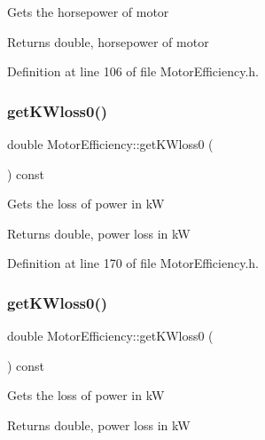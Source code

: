 Gets the horsepower of motor \begin{DoxyReturn}{Returns}
double, horsepower of motor 
\end{DoxyReturn}


Definition at line 106 of file Motor\+Efficiency.\+h.

\mbox{\label{class_motor_efficiency_a47398ac8203f5b79a0ca435673a4bc16}} 
\subsubsection{\texorpdfstring{get\+K\+Wloss0()}{getKWloss0()}\hspace{0.1cm}{\footnotesize\ttfamily [1/3]}}
{\footnotesize\ttfamily double Motor\+Efficiency\+::get\+K\+Wloss0 (\begin{DoxyParamCaption}{ }\end{DoxyParamCaption}) const\hspace{0.3cm}{\ttfamily [inline]}}

Gets the loss of power in kW \begin{DoxyReturn}{Returns}
double, power loss in kW 
\end{DoxyReturn}


Definition at line 170 of file Motor\+Efficiency.\+h.

\mbox{\label{class_motor_efficiency_a47398ac8203f5b79a0ca435673a4bc16}} 
\subsubsection{\texorpdfstring{get\+K\+Wloss0()}{getKWloss0()}\hspace{0.1cm}{\footnotesize\ttfamily [2/3]}}
{\footnotesize\ttfamily double Motor\+Efficiency\+::get\+K\+Wloss0 (\begin{DoxyParamCaption}{ }\end{DoxyParamCaption}) const\hspace{0.3cm}{\ttfamily [inline]}}

Gets the loss of power in kW \begin{DoxyReturn}{Returns}
double, power loss in kW 
\end{DoxyReturn}


